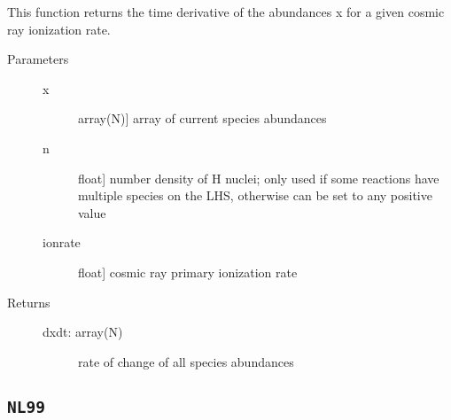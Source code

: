\documentclass[letterpaper,10pt,english]{sphinxmanual}
\begin{document}
\begin{fulllineitems}
\begin{description}
\end{description}

\begin{fulllineitems}
\label{fulldoc:despotic.chemistry.cr_reactions.dxdt}
This function returns the time derivative of the abundances x
for a given cosmic ray ionization rate.
\begin{description}
\item[{Parameters}] \leavevmode\begin{description}
\item[{x}] \leavevmode{[}array(N){]}
array of current species abundances

\item[{n}] \leavevmode{[}float{]}
number density of H nuclei; only used if some reactions
have multiple species on the LHS, otherwise can be set to
any positive value

\item[{ionrate}] \leavevmode{[}float{]}
cosmic ray primary ionization rate

\end{description}

\item[{Returns}] \leavevmode\begin{description}
\item[{dxdt: array(N)}] \leavevmode
rate of change of all species abundances

\end{description}

\end{description}

\end{fulllineitems}


\end{fulllineitems}



\subsection{\texttt{NL99}}
\label{fulldoc:nl99}
\end{document}
